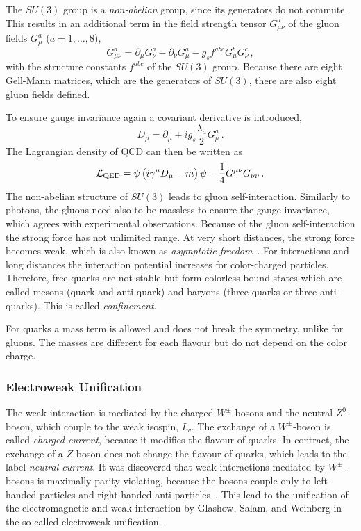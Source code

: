 The $SU(3)$ group is a \emph{non-abelian} group, since its generators do not commute.
This results in an additional term in the field strength tensor $G_{\mu\nu}^a$ of the gluon fields $G_\mu^a$ ($a = 1, \ldots, 8$),
\begin{equation}
    G_{\mu\nu}^a = \partial_\mu G_\nu^a -  \partial_\nu G_\mu^a - g_s f^{abc} G_\mu^b G_\nu^c \,,
\end{equation}
with the structure constants $f^{abc}$ of the $SU(3)$ group.
Because there are eight Gell-Mann matrices, which are the generators of $SU(3)$, there are also eight gluon fields defined.

To ensure gauge invariance again a covariant derivative is introduced,
\begin{equation}
    D_\mu = \partial_\mu + i g_s \frac{\lambda_a}{2} G_\mu^a \,.
\end{equation}
The Lagrangian density of QCD can then be written as
\begin{equation}
    \mathcal{L}_\text{QED} = \bar{\psi} \left( i \gamma^\mu D_\mu -m \right) \psi - \frac{1}{4} G^{\mu\nu} G_{\nu\nu} \,.
\end{equation}
The non-abelian structure of $SU(3)$ leads to gluon self-interaction.
Similarly to photons, the gluons need also to be massless to ensure the gauge invariance, which agrees with experimental observations.
Because of the gluon self-interaction the strong force has not unlimited range.
At very short distances, the strong force becomes weak, which is also known as \emph{asymptotic freedom}~\cite{AsymFreedom1,AsymFreedom2}.
For interactions and long distances the interaction potential increases for color-charged particles.
Therefore, free quarks are not stable but form colorless bound states which are called mesons (quark and anti-quark) and
baryons (three quarks or three anti-quarks).
This is called \emph{confinement}.

For quarks a mass term is allowed and does not break the symmetry, unlike for gluons.
The masses are different for each flavour but do not depend on the color charge.

\subsubsection{Electroweak Unification}

The weak interaction is mediated by the charged $W^\pm$-bosons and the neutral $Z^0$-boson, which couple to the weak
isospin, $I_w$.
The exchange of a $W^\pm$-boson is called \emph{charged current}, because it modifies the flavour of quarks.
In contract, the exchange of a $Z$-boson does not change the flavour of quarks, which leads to the label \emph{neutral current}.
It was discovered that weak interactions mediated by $W^\pm$-bosons is maximally parity violating, because the bosons couple only to
left-handed particles and right-handed anti-particles~\cite{PhysRev.104.254,PhysRev.105.1413}.
This lead to the unification of the electromagnetic and weak interaction by Glashow, Salam, and Weinberg in the
so-called electroweak unification~\cite{Glashow1961,Salam1959,Weinberg1967}.

